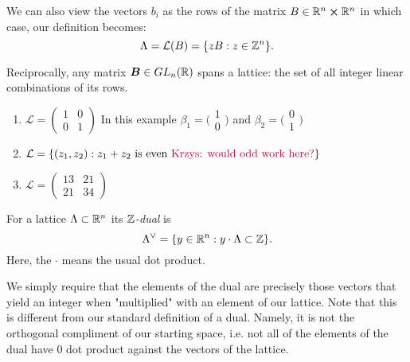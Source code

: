 \begin{remark}
    We can also view the vectors $b_i$ as the rows of the matrix $B \in \mathbb{R}^n \cross \mathbb{R}^n$ in which case, our definition becomes:
$$\Lambda = \mathcal{L}(B) = \{zB :  z \in \mathbb{Z}^n \}.$$
\end{remark}

Reciprocally, any matrix $\boldsymbol{B} \in GL_n(\mathbb{R})$ spans a lattice: the set of all integer linear combinations of its rows.

\begin{example}
\begin{enumerate}
    \item $\mathcal{L} = \begin{pmatrix}
        1 & 0\\
        0 & 1
        \end{pmatrix}$ In this example $\beta_1 = \big(\begin{smallmatrix}
          1\\
          0
        \end{smallmatrix}\big)$ and $\beta_2 = \big(\begin{smallmatrix}
          0\\
          1
        \end{smallmatrix}\big)$
    \item $\mathcal{L} = \{(z_1,z_2) : z_1 + z_2 \text{ is even \textcolor{purple}{Krzys: would odd work here?}}\}$
    \item $\mathcal{L} = \begin{pmatrix}
        13 & 21\\
        21 & 34
        \end{pmatrix}$
\end{enumerate}
\end{example}

\begin{definition}[Dual]
    For a lattice $\Lambda \subset \mathbb{R}^n$ its $\mathbb{Z}$\textit{-dual} is
    $$ \Lambda^{\vee} = \{ y \in \mathbb{R}^n : y \cdot \Lambda \subset \mathbb{Z} \}.$$
    Here, the $\cdot$ means the usual dot product.
\end{definition}

We simply require that the elements of the dual are precisely those vectors that yield an integer when "multiplied" with an element of our lattice. Note that this is different from our standard definition of a dual. Namely, it is not the orthogonal compliment of our starting space, i.e. not all of the elements of the dual have 0 dot product against the vectors of the lattice.

